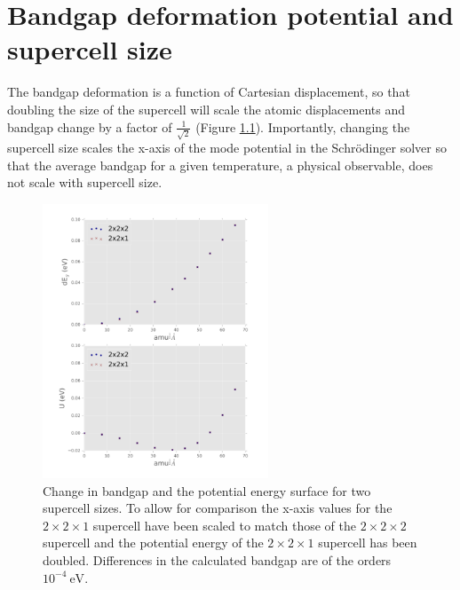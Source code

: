 \chapter{\label{app:6-SCcompare}Bandgap deformation potential and supercell size}

The bandgap deformation is a function of Cartesian displacement, so that doubling the size of the supercell will scale the atomic displacements and bandgap change by a factor of $\frac{1}{\sqrt{2}}$ (Figure \ref{ch5scaling}).  %
Importantly, changing the supercell size scales the x-axis of the mode potential in the Schr\"{o}dinger solver so that the average bandgap for a given temperature, a physical observable, does not scale with supercell size.

\begin{figure}[]
\includegraphics[width=0.6\textwidth]{figures/ch5/SCcompare.png} \centering
\caption[Bandgap deformation potential and supercell size]{\label{ch5scaling}
Change in bandgap and the potential energy surface for two supercell sizes. To allow for comparison the x-axis values for the $2\times2\times1$ supercell have been scaled to match those of the $2\times2\times2$ supercell and the potential energy of the $2\times2\times1$ supercell has been doubled.  Differences in the calculated bandgap are of the orders $10^{−4}\ \textrm{eV}$.
}
\end{figure}


